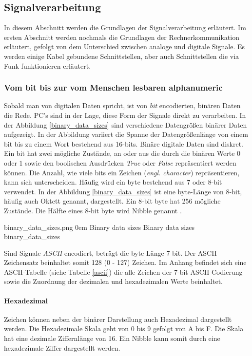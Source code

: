 \subsection{Signalverarbeitung}

In diesem Abschnitt werden die Grundlagen der Signalverarbeitung erläutert. Im ersten Abschnitt werden nochmals die Grundlagen der Rechnerkommunikation erläutert, gefolgt von dem Unterschied zwischen analoge und digitale Signale. Es werden einige Kabel gebundene Schnittstellen, aber auch Schnittstellen die via Funk funktionieren erläutert.

\subsubsection{Vom bit bis zur vom Menschen lesbaren alphanumeric}

Sobald man von digitalen Daten spricht, ist von \textit{bit} encodierten, binären Daten die Rede. PC's sind in der Lage, diese Form der Signale direkt zu verarbeiten. In der Abbildung \ref{binary_data_sizes} sind verschiedene Datengrößen binärer Daten aufgezeigt. In der Abbildung variiert die Spanne der Datengrößenlänge von einem bit bis zu einem Wort bestehend aus 16-bits. Binäre digitale Daten sind diskret. Ein bit hat zwei mögliche Zustände, an oder aus die durch die binären Werte 0 oder 1 sowie den boolischen Ausdrücken \textit{True} oder \textit{False} repräsentiert werden können. Die Anzahl, wie viele bits ein Zeichen (\textit{engl. character}) repräsentieren, kann sich unterscheiden. Häufig wird ein byte bestehend aus 7 oder 8-bit verwendet. In der Abbildung \ref{binary_data_sizes} ist eine byte-Länge von 8-bit, häufig auch Oktett genannt, dargestellt. Ein 8-bit byte hat 256 mögliche Zustände. Die Hälfte eines 8-bit byte wird Nibble genannt \cite[S. 3]{hughes2010real}.

{binary_data_sizes.png}
{0em}
{Binary data sizes }
{Binary data sizes \cite[S. 3]{hughes2010real} }
{binary_data_sizes}

Sind Signale \textit{ASCII} encodiert, beträgt die byte Länge 7 bit. Der ASCII Zeichensatz beinhaltet somit 128 (0 - 127) Zeichen. Im Anhang befindet sich eine ASCII-Tabelle (siehe Tabelle \ref{ascii}) die alle Zeichen der 7-bit ASCII Codierung sowie die Zuordnung der dezimalen und hexadezimalen Werte beinhaltet. \\

\paragraph{Hexadezimal} Zeichen können neben der binärer Darstellung auch Hexadezimal dargestellt werden. Die Hexadezimale Skala geht von 0 bis 9 gefolgt von A bis F. Die Skala hat eine dezimale Ziffernlänge von 16. Ein Nibble kann somit durch eine hexadezimale Ziffer dargestellt werden.

